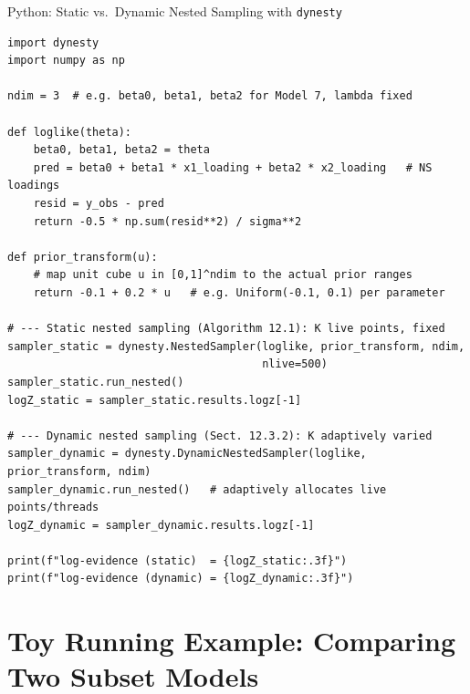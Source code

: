 \documentclass[aspectratio=169,10pt]{beamer}
\begin{document}
\begin{frame}[fragile]{Python: Static vs.\ Dynamic Nested Sampling with \texttt{dynesty}}
\begin{lstlisting}[caption={Book's actual tool: the dynesty package (Speagle, 2020), default settings}]
import dynesty
import numpy as np

ndim = 3  # e.g. beta0, beta1, beta2 for Model 7, lambda fixed

def loglike(theta):
    beta0, beta1, beta2 = theta
    pred = beta0 + beta1 * x1_loading + beta2 * x2_loading   # NS loadings
    resid = y_obs - pred
    return -0.5 * np.sum(resid**2) / sigma**2

def prior_transform(u):
    # map unit cube u in [0,1]^ndim to the actual prior ranges
    return -0.1 + 0.2 * u   # e.g. Uniform(-0.1, 0.1) per parameter

# --- Static nested sampling (Algorithm 12.1): K live points, fixed
sampler_static = dynesty.NestedSampler(loglike, prior_transform, ndim,
                                       nlive=500)
sampler_static.run_nested()
logZ_static = sampler_static.results.logz[-1]

# --- Dynamic nested sampling (Sect. 12.3.2): K adaptively varied
sampler_dynamic = dynesty.DynamicNestedSampler(loglike, prior_transform, ndim)
sampler_dynamic.run_nested()   # adaptively allocates live points/threads
logZ_dynamic = sampler_dynamic.results.logz[-1]

print(f"log-evidence (static)  = {logZ_static:.3f}")
print(f"log-evidence (dynamic) = {logZ_dynamic:.3f}")
\end{lstlisting}
\end{frame}

\section{Toy Running Example: Comparing Two Subset Models}
\end{document}
